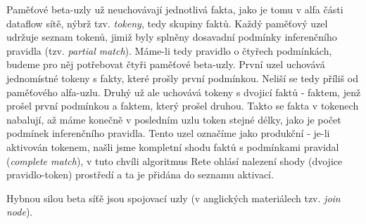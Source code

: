 Paměťové beta-uzly už neuchovávají jednotlivá fakta, jako je tomu v alfa
části dataflow sítě, nýbrž tzv. \emph{tokeny}, tedy skupiny faktů. Každý
paměťový uzel udržuje seznam tokenů, jimiž byly splněny dosavadní podmínky
inferenčního pravidla (tzv. \emph{partial match}). Máme-li tedy pravidlo
o čtyřech podmínkách, budeme pro něj potřebovat čtyři paměťové beta-uzly.
První uzel uchovává jednomístné tokeny s fakty, které prošly první podmínkou.
Neliší se tedy příliš od paměťového alfa-uzlu. Druhý už ale uchovává tokeny
s dvojicí faktů - faktem, jenž prošel první podmínkou a faktem, který prošel
druhou. Takto se fakta v tokenech nabalují, až máme konečně v posledním uzlu
token stejné délky, jako je počet podmínek inferenčního pravidla. Tento uzel
označíme jako produkční - je-li aktivován tokenem, našli jsme kompletní
shodu faktů s podmínkami pravidal (\emph{complete match}), v tuto chvíli
algoritmus Rete ohlásí nalezení shody (dvojice pravidlo-token) prostředí
a ta je přidána do seznamu aktivací.

Hybnou silou beta síťě jsou spojovací uzly (v anglických materiálech tzv.
\emph{join node}). 
